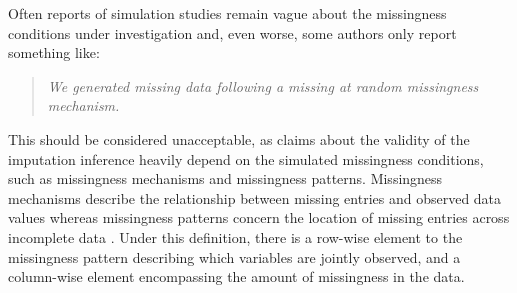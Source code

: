 \documentclass[bimj,fleqn]{w-art}
\begin{document}

Often reports of simulation studies remain vague about the missingness conditions under investigation and, even worse, some authors only report something like:
\begin{quote}
\textit{We generated missing data following a missing at random missingness mechanism.}
\end{quote}
This should be considered unacceptable, as claims about the validity of the imputation inference heavily depend on the simulated missingness conditions, such as missingness mechanisms and missingness patterns. Missingness mechanisms describe the relationship between missing entries and observed data values whereas missingness patterns concern the location of missing entries across incomplete data \citep[][p. 8]{litt20}. Under this definition, there is a row-wise element to the missingness pattern describing which variables are jointly observed, and a column-wise element encompassing the amount of missingness in the data. 
\end{document}
